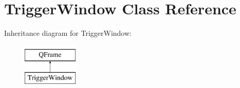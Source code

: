 \hypertarget{class_trigger_window}{}\section{Trigger\+Window Class Reference}
\label{class_trigger_window}
Inheritance diagram for Trigger\+Window\+:\begin{figure}[H]
\begin{center}
\leavevmode
\includegraphics[height=2.000000cm]{class_trigger_window}
\end{center}
\end{figure}
